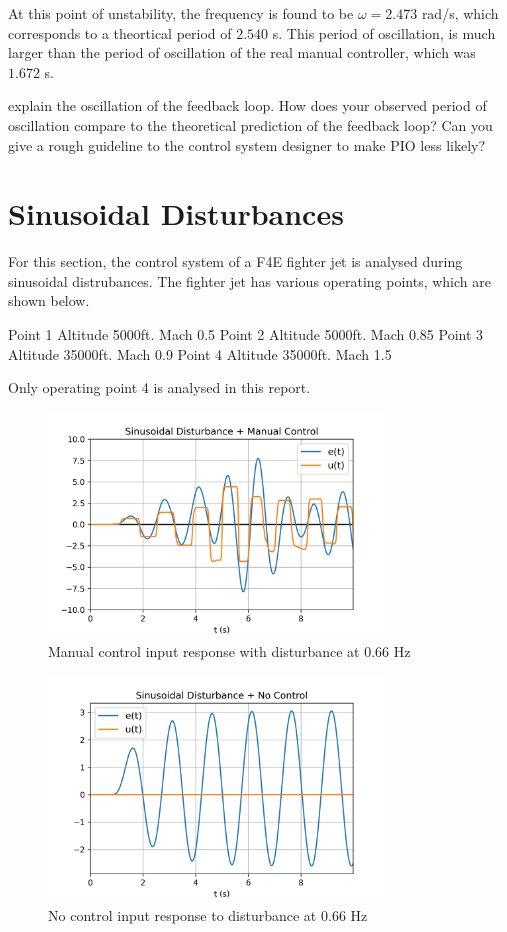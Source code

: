 \documentclass[8pt]{article}
\begin{document}
At this point of unstability, the frequency is found to be $\omega = 2.473$ rad/s, which corresponds to a theortical period of $2.540$ s.
This period of oscillation, is much larger than the period of oscillation of the real manual controller, which was $1.672$ s.

explain the oscillation of the feedback loop. How does your observed period of oscillation compare to the theoretical prediction of the feedback loop?
Can you give a rough guideline to the control system designer to make PIO less likely?

\section{Sinusoidal Disturbances}

For this section, the control system of a F4E fighter jet is analysed during sinusoidal distrubances.
The fighter jet has various operating points, which are shown below.

Point 1 Altitude 5000ft. Mach 0.5
Point 2 Altitude 5000ft. Mach 0.85
Point 3 Altitude 35000ft. Mach 0.9
Point 4 Altitude 35000ft. Mach 1.5

Only operating point 4 is analysed in this report.

\begin{figure}[H]
    \centering
    \includegraphics[width=0.8\textwidth]{figures/FIGURE_7.png}
    \caption{Manual control input response with disturbance at $0.66$ Hz}
    \label{fig:figure7}
\end{figure}

\newpage

\begin{figure}[H]
    \centering
    \includegraphics[width=0.8\textwidth]{figures/FIGURE_8.png}
    \caption{No control input response to disturbance at $0.66$ Hz}
    \label{fig:figure8}
\end{figure}
\end{document}
